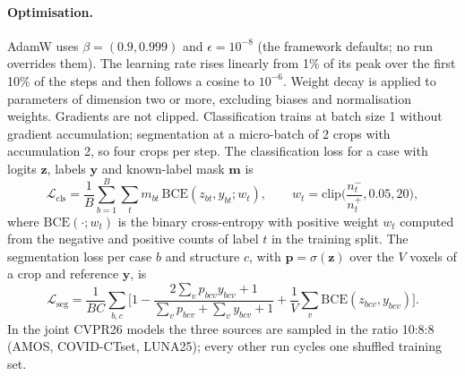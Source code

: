 \paragraph{Optimisation.} AdamW uses $\beta=(0.9, 0.999)$ and $\epsilon=10^{-8}$ (the framework defaults; no run overrides them). The learning rate rises linearly from 1\% of its peak over the first 10\% of the steps and then follows a cosine to $10^{-6}$. Weight decay is applied to parameters of dimension two or more, excluding biases and normalisation weights. Gradients are not clipped. Classification trains at batch size 1 without gradient accumulation; segmentation at a micro-batch of 2 crops with accumulation 2, so four crops per step. The classification loss for a case with logits $\bm{z}$, labels $\bm{y}$ and known-label mask $\bm{m}$ is
\begin{equation}
\mathcal{L}_{\text{cls}}=\frac{1}{B}\sum_{b=1}^{B}\sum_{t} m_{bt}\,\mathrm{BCE}(z_{bt}, y_{bt}; w_t), \qquad w_t=\mathrm{clip}\Big(\frac{n^{-}_t}{n^{+}_t}, 0.05, 20\Big),
\label{eq:lcls}
\end{equation}
where $\mathrm{BCE}(\cdot;w_t)$ is the binary cross-entropy with positive weight $w_t$ computed from the negative and positive counts of label $t$ in the training split. The segmentation loss per case $b$ and structure $c$, with $\bm{p}=\sigma(\bm{z})$ over the $V$ voxels of a crop and reference $\bm{y}$, is
\begin{equation}
\mathcal{L}_{\text{seg}}=\frac{1}{BC}\sum_{b,c}\Big[1-\frac{2\sum_v p_{bcv}y_{bcv}+1}{\sum_v p_{bcv}+\sum_v y_{bcv}+1}+\frac{1}{V}\sum_v \mathrm{BCE}(z_{bcv},y_{bcv})\Big].
\label{eq:lseg}
\end{equation}
In the joint CVPR26 models the three sources are sampled in the ratio 10:8:8 (AMOS, COVID-CTset, LUNA25); every other run cycles one shuffled training set.

